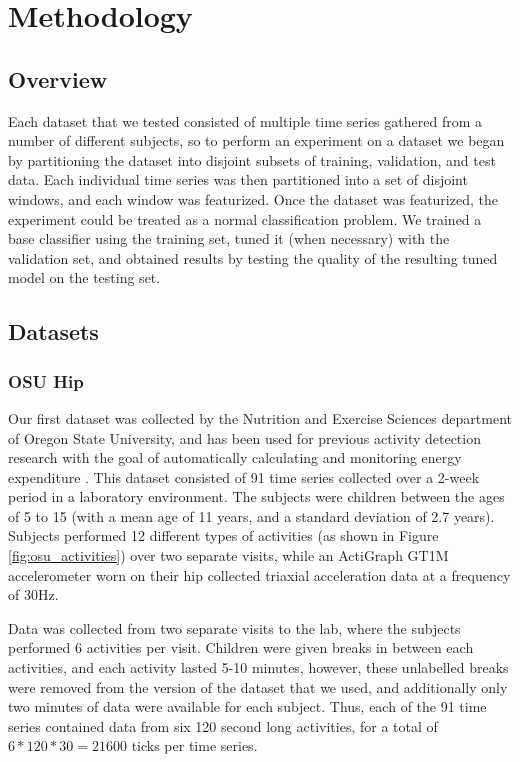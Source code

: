 \chapter{Methodology}
\section{Overview}
Each dataset that we tested consisted of multiple time series gathered from
a number of different subjects, so to perform an experiment on a dataset we began by
partitioning the dataset into disjoint subsets of training, validation,
and test data. Each individual time series was then partitioned into
a set of disjoint windows, and each window was featurized. Once the dataset was
featurized, the experiment could be treated as a normal classification problem.
We trained a base classifier using the training set, tuned it (when necessary)
with the validation set, and obtained results by testing the quality of the
resulting tuned model on the testing set.


\section{Datasets}
\subsection{OSU Hip}
Our first dataset was collected by the Nutrition and Exercise Sciences department of
Oregon State University, and has been used for previous activity detection research
with the goal of automatically calculating and monitoring energy expenditure
\cite{trost12} \cite{zheng12}.
This dataset consisted of 91 time series collected over a 2-week period in a
laboratory environment. The subjects were children between the ages of 5 to 15
(with a mean age of 11 years, and a standard deviation of 2.7 years).
Subjects performed 12 different types of activities (as shown in Figure \ref{fig:osu_activities})
over two separate visits, while an ActiGraph GT1M accelerometer worn on their hip 
collected triaxial acceleration data at a frequency of 30Hz.

Data was collected from two separate visits to the lab, where the subjects performed 6 activities per visit.
Children were given breaks in between each activities, and each activity lasted 5-10
minutes, however, these unlabelled breaks were removed from the version of the dataset that we
used, and additionally only two minutes of data were available for each subject. Thus, each of
the 91 time series contained data from six 120 second long activities, for a total of
$6*120*30 = 21600$ ticks per time series.

